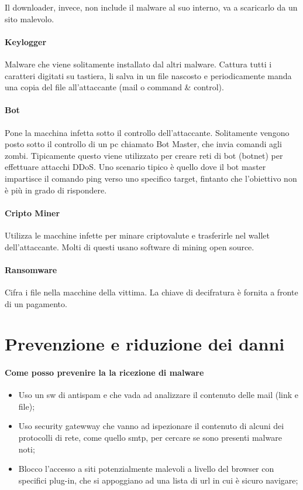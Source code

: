 Il downloader, invece, non include il malware al suo interno, va a scaricarlo da un sito malevolo.

\paragraph{Keylogger} Malware che viene solitamente installato dal altri malware. Cattura tutti i caratteri digitati su tastiera, li salva in un file nascosto e periodicamente manda una copia del file all'attaccante (mail o command \& control).

\paragraph{Bot} Pone la macchina infetta sotto il controllo dell'attaccante. Solitamente vengono posto sotto il controllo di un pc chiamato Bot Master, che invia comandi agli zombi. Tipicamente questo viene utilizzato per creare reti di bot (botnet) per effettuare attacchi DDoS. Uno scenario tipico è quello dove il bot master impartisce il comando ping verso uno specifico target, fintanto che l'obiettivo non è più in grado di rispondere.

\paragraph{Cripto Miner} Utilizza le macchine infette per minare criptovalute e trasferirle nel wallet dell'attaccante. Molti di questi usano software di mining open source.

\paragraph{Ransomware} Cifra i file nella macchine della vittima. La chiave di decifratura è fornita a fronte di un pagamento.

\section{Prevenzione e riduzione dei danni}
\paragraph{Come posso prevenire la  la ricezione di malware}
\begin{itemize}
    \item  Uso un sw di antispam e che vada ad analizzare il contenuto delle mail (link e file);
    \item Uso security gatewway che vanno ad ispezionare il contenuto di alcuni dei protocolli di rete, come quello smtp, per cercare se sono presenti malware noti;
    \item Blocco l'accesso a siti potenzialmente malevoli a livello del browser con specifici plug-in, che si appoggiano ad una lista di url in cui è sicuro navigare;
\end{itemize}

